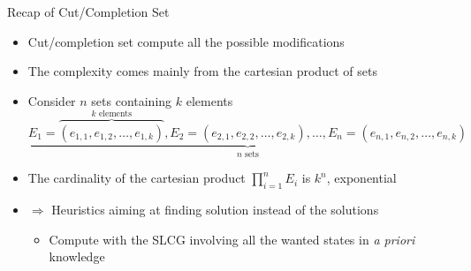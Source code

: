 \begin{frame}{Recap of Cut/Completion Set}
    \begin{itemize}[<+->]
        \item Cut/completion set compute all the possible modifications
        \item The complexity comes mainly from the cartesian product of sets
        \item Consider $n$ sets containing $k$ elements
        $\underbrace{E_1=\overbrace{(e_{1,1},e_{1,2},\ldots,e_{1,k})}^\text{$k$ elements},E_2=(e_{2,1},e_{2,2},\ldots,e_{2,k}),\ldots,E_n=(e_{n,1},e_{n,2},\ldots,e_{n,k})}_\text{$n$ sets}$
        \item The cardinality of the cartesian product $\prod_{i=1}^{n}{E_i}$ is $k^n$, exponential
        \item$\Longrightarrow$ Heuristics aiming at finding  solution instead of  the solutions
        \begin{itemize}
            \item Compute with the SLCG involving all the wanted states in \textit{a priori} knowledge
        \end{itemize}
    \end{itemize}
\end{frame}